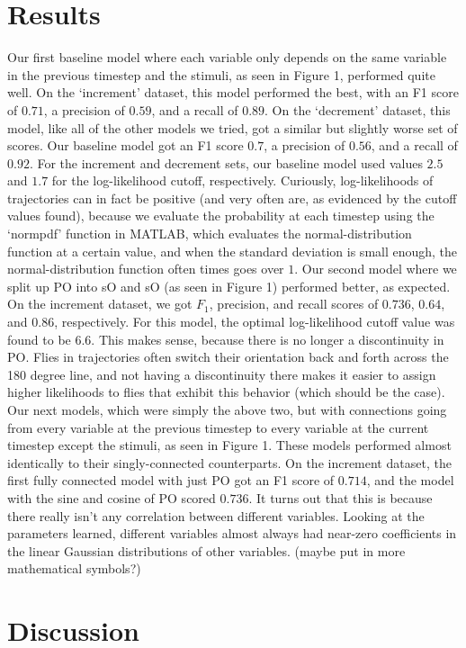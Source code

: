 \documentclass{article} %
\begin{document}
\normalsize
\section{Results}
Our first baseline model where each variable only depends on the same variable in the previous timestep and the stimuli, as seen in Figure 1, performed quite well. On the `increment’ dataset, this model performed the best, with an F1 score of $0.71$, a precision of $0.59$, and a recall of $0.89$. On the ‘decrement’ dataset, this model, like all of the other models we tried, got a similar but slightly worse set of scores. Our baseline model got an F1 score $0.7$, a precision of $0.56$, and a recall of $0.92$. For the increment and decrement sets, our baseline model used values $2.5$ and $1.7$ for the log-likelihood cutoff, respectively. Curiously, log-likelihoods of trajectories can in fact be positive (and very often are, as evidenced by the cutoff values found), because we evaluate the probability at each timestep using the `normpdf’ function in MATLAB, which evaluates the normal-distribution function at a certain value, and when the standard deviation is small enough, the normal-distribution function often times goes over $1$.
Our second model where we split up PO into sO and sO (as seen in Figure 1) performed better, as expected. On the increment dataset, we got $F_1$, precision, and recall scores of $0.736$, $0.64$, and $0.86$, respectively. For this model, the optimal log-likelihood cutoff value was found to be 6.6. This makes sense, because there is no longer a discontinuity in PO. Flies in trajectories often switch their orientation back and forth across the 180 degree line, and not having a discontinuity there makes it easier to assign higher likelihoods to flies that exhibit this behavior (which should be the case).
Our next models, which were simply the above two, but with connections going from every variable at the previous timestep to every variable at the current timestep except the stimuli, as seen in Figure 1. These models performed almost identically to their singly-connected counterparts. On the increment dataset, the first fully connected model with just PO got an F1 score of $0.714$, and the model with the sine and cosine of PO scored $0.736$. It turns out that this is because there really isn’t any correlation between different variables. Looking at the parameters learned, different variables almost always had near-zero coefficients in the linear Gaussian distributions of other variables. (maybe put in more mathematical symbols?)

\section{Discussion}
\end{document}
